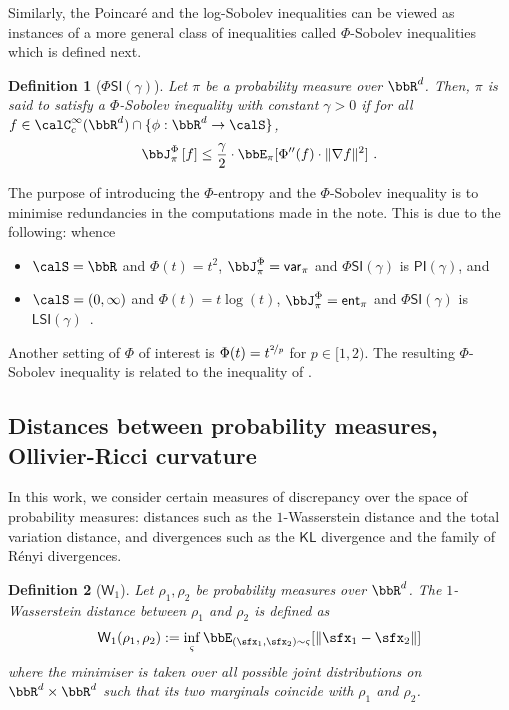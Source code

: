 \documentclass[11pt]{article}
\newtheorem{definition}{Definition}[section]
\newcounter{ct}
\newcommand{\PI}[1]{\mathsf{PI}\left(#1\right)}
\newcommand{\LSI}[1]{\mathsf{LSI}\left(#1\right)}
\newcommand{\PhiSI}[1]{\Phi\mathsf{SI}\left(#1\right)}
\newcommand{\Phient}[3]{
    \ensuremath{\if$#3$\bbJ_{#1}^{#2}\else\bbJ_{#1}^{#2}\left[#3\right]\fi}}
\newcommand{\cssf}[1]{\calC_{c}^{\infty}(#1)}
\newcommand{\var}{\mathsf{var}}
\newcommand{\ent}{\mathsf{ent}}
\begin{document}
Similarly, the Poincar\'{e} and the log-Sobolev inequalities can be viewed as instances of a more general class of inequalities called \(\Phi\)-Sobolev inequalities \citep{chafai2004entropies} which is defined next.

\begin{definition}[\(\PhiSI{\gamma}\)]
Let \(\pi\) be a probability measure over \(\bbR^{d}\).
Then, \(\pi\) is said to satisfy a \(\Phi\)-Sobolev inequality with constant \(\gamma > 0\) if for all \(f \in \cssf{\bbR^{d}} \cap \{\phi : \bbR^{d} \to \calS\}\),
\begin{equation*}
    \Phient{\pi}{\Phi}{f} \leq \frac{\gamma}{2} \cdot \bbE_{\pi}[\Phi''(f) \cdot \|\nabla f\|^{2}]~.
\end{equation*}
\end{definition}

The purpose of introducing the \(\Phi\)-entropy and the \(\Phi\)-Sobolev inequality is to minimise redundancies in the computations made in the note.
This is due to the following: whence
\begin{itemize}[leftmargin=*, itemsep=0pt]
    \item \(\calS = \bbR\) and \(\Phi(t) = t^{2}\), \(\Phient{\pi}{\Phi}{} = \var{}_{\pi}\) and \(\PhiSI{\gamma}\) is \(\PI{\gamma}\), and
    \item \(\calS = (0, \infty)\) and \(\Phi(t) = t\log(t)\), \(\Phient{\pi}{\Phi}{} = \ent{}_{\pi}\) and \(\PhiSI{\gamma}\) is \(\LSI{\gamma}\)~.
\end{itemize}
Another setting of \(\Phi\) of interest is \(\Phi(t) = t^{\nicefrac{2}{p}}\) for \(p \in [1, 2)\).
The resulting \(\Phi\)-Sobolev inequality is related to the inequality of \citet{latala2007between}.

\subsection{Distances between probability measures, Ollivier-Ricci curvature}

In this work, we consider certain measures of discrepancy over the space of probability measures: distances such as the \(1\)-Wasserstein distance and the total variation distance, and divergences such as the \(\mathsf{KL}\) divergence and the family of R\'{e}nyi divergences.

\begin{definition}[\(\mathsf{W}_{1}\)]
Let \(\rho_{1}, \rho_{2}\) be probability measures over \(\bbR^{d}\).
The \(1\)-Wasserstein distance between \(\rho_{1}\) and \(\rho_{2}\) is defined as
\begin{equation*}
    \mathsf{W}_{1}(\rho_{1}, \rho_{2}) := \inf_{\varsigma} \bbE_{(\sfx_{1}, \sfx_{2}) \sim \varsigma}[\|\sfx_{1} - \sfx_{2}\|]
\end{equation*}
where the minimiser is taken over all possible joint distributions on \(\bbR^{d} \times \bbR^{d}\) such that its two marginals coincide with \(\rho_{1}\) and \(\rho_{2}\).
\end{definition}
\end{document}

